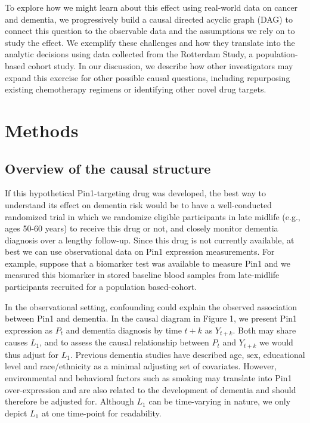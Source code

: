 \documentclass[
]{book}
\begin{document}
To explore how we might learn about this effect using real-world data on cancer and dementia, we progressively build a causal directed acyclic graph (DAG) to connect this question to the observable data and the assumptions we rely on to study the effect. We exemplify these challenges and how they translate into the analytic decisions using data collected from the Rotterdam Study, a population-based cohort study. In our discussion, we describe how other investigators may expand this exercise for other possible causal questions, including repurposing existing chemotherapy regimens or identifying other novel drug targets.

\hypertarget{methods-2}{%
\section{Methods}\label{methods-2}}

\hypertarget{overview-of-the-causal-structure}{%
\subsection{Overview of the causal structure}\label{overview-of-the-causal-structure}}

If this hypothetical Pin1-targeting drug was developed, the best way to understand its effect on dementia risk would be to have a well-conducted randomized trial in which we randomize eligible participants in late midlife (e.g., ages 50-60 years) to receive this drug or not, and closely monitor dementia diagnosis over a lengthy follow-up. Since this drug is not currently available, at best we can use observational data on Pin1 expression measurements. For example, suppose that a biomarker test was available to measure Pin1 and we measured this biomarker in stored baseline blood samples from late-midlife participants recruited for a population based-cohort.

In the observational setting, confounding could explain the observed association between Pin1 and dementia. In the causal diagram\autocite{whatif2020} in Figure 1, we present Pin1 expression as \(P_{t}\) and dementia diagnosis by time \(t+k\) as \(Y_{t+k}\). Both may share causes \(L_1\), and to assess the causal relationship between \(P_{t}\) and \(Y_{t+k}\) we would thus adjust for \(L_1\). Previous dementia studies have described age, sex, educational level and race/ethnicity as a minimal adjusting set of covariates\autocite{ospina2020}. However, environmental and behavioral factors such as smoking may translate into Pin1 over-expression\autocite{tan2010} and are also related to the development of dementia\autocite{dementia_lancet} and should therefore be adjusted for. Although \(L_1\) can be time-varying in nature, we only depict \(L_1\) at one time-point for readability.
\end{document}
